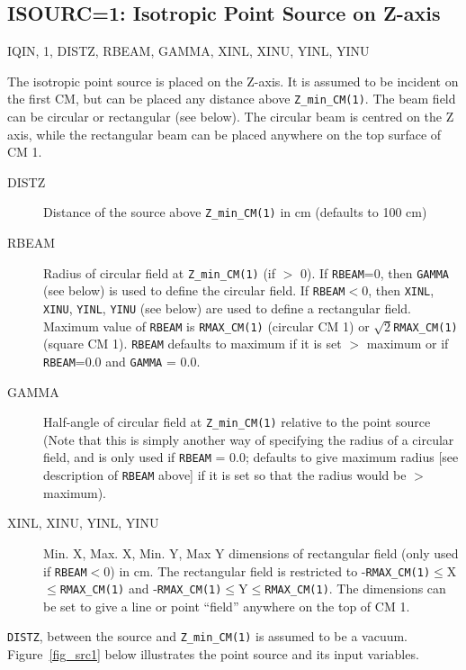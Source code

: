 \documentclass[12pt,twoside]{article}
\newcommand{\cen}[1]{\begin{center} #1 \end{center}                   }
\begin{document}
\clearpage
\vspace*{-2cm}
\subsection{ISOURC=1: Isotropic Point Source on Z-axis}
\vspace*{-0.2cm}
\cen{IQIN, 1, DISTZ, RBEAM, GAMMA, XINL, XINU, YINL, YINU}

The isotropic point source is placed on the Z-axis.  It is
assumed to be incident on the first CM, but can be placed any distance above
\verb+Z_min_CM(1)+.  The beam field can be circular or
rectangular (see below).
The circular beam is centred on the Z axis, while the rectangular beam can
be placed anywhere on the top surface of CM 1.
\begin{description}
\item [DISTZ] Distance of the source above \verb+Z_min_CM(1)+ in cm (defaults to 100 cm)
\item [RBEAM] Radius of circular field at \verb+Z_min_CM(1)+ (if $>$ 0).
If {\tt RBEAM}=0, then {\tt GAMMA} (see below) is used to define the
circular field.  If {\tt RBEAM}$<$0, then
{\tt XINL}, {\tt XINU}, {\tt YINL}, {\tt YINU} (see below) are used to define a
rectangular field.  Maximum value of {\tt RBEAM} is
\verb+RMAX_CM(1)+ (circular CM 1) or $\sqrt{2}$\verb+RMAX_CM(1)+ (square CM 1).
{\tt RBEAM} defaults to maximum if it is set $>$ maximum or if
\verb+RBEAM+=0.0 and \verb+GAMMA+ = 0.0.
\item [GAMMA] Half-angle of circular field
at \verb+Z_min_CM(1)+ relative to the point source
(Note that this is simply another way of specifying the radius of a circular field,
and is only used if \verb+RBEAM+ = 0.0; defaults to give maximum radius [see
description of \verb+RBEAM+ above] if
it is set so that the radius would be $>$ maximum).
\item [XINL, XINU, YINL, YINU] Min. X, Max. X, Min. Y, Max Y dimensions
 of rectangular field (only used if {\tt RBEAM}$<$0) in cm.
The rectangular field
is restricted to -\verb+RMAX_CM(1)+$\leq$X$\leq$\verb+RMAX_CM(1)+ and
-\verb+RMAX_CM(1)+$\leq$Y$\leq$\verb+RMAX_CM(1)+.  The dimensions can be set
to give a line or point ``field'' anywhere on the top of CM 1.
\end{description}
\verb+DISTZ+, between the source and \verb+Z_min_CM(1)+ is assumed to be a vacuum.
Figure~\ref{fig_src1} below illustrates the point source and its input variables.
\end{document}
